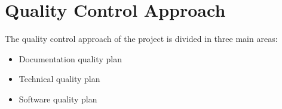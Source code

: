 \section{Quality Control Approach}


The quality control approach of the project is divided in three main areas:
\begin{itemize}
	\item Documentation quality plan
	\item Technical quality plan
	\item Software quality plan
\end{itemize}

